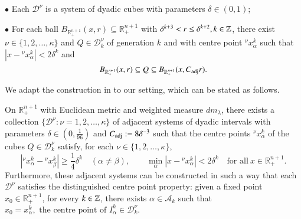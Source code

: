 \documentclass[12pt]{amsart}
\begin{document}
$\bullet$ Each $\mathcal{D}^\nu$ is a
system of dyadic cubes with parameters $\delta\in (0,1)$;

$\bullet$ For each ball
$B_{\mathbb{R}_+^{n+1}}(x,r)\subseteq \mathbb{R}_+^{n+1}$ with $\delta^{k+3}<r\leq\delta^{k+2},
k\in\mathbb{Z}$, there exist $\nu \in \{1, 2, \ldots, \kappa\}$ and
$Q\in\mathcal{D}_{k}^\nu$ of generation $k$ and with centre point
$^\nu x^k_{\alpha}$ such that $|x-{}^\nu x_{\alpha}^k| <
2\delta^{k}$ and
\begin{equation}\label{eq:ball;included}
    B_{\mathbb{R}_+^{n+1}}(x,r)\subseteq Q\subseteq B_{\mathbb{R}_+^{n+1}}(x,C_{\rm adj}r).
\end{equation}

We adapt the construction in \cite{HK} to our setting, which can be stated as follows.
\begin{lemma}\label{thm:existence2}
On $\mathbb{R}_+^{n+1}$ with Euclidean metric and weighted measure $dm_\lambda$, there exists a collection $\{\mathcal{D}^\nu\colon
    \nu = 1,2,\ldots ,\kappa\}$ of adjacent systems of dyadic intervals with
    parameters $\delta\in (0, \frac{1}{96}) $ and $C_{\rm adj} := 8\delta^{-3}$ such that the centre points
    $^\nu x^k_{\alpha}$ of the cubes $Q\in\mathcal{D}^\nu_{k}$ satisfy, for each
    $\nu \in\{1,2,\ldots,\kappa\}$,
    \begin{equation*}
        |^\nu x_{\alpha}^k- {}^\nu x_{\beta}^k|
        \geq \frac{1}{4}\delta^k\quad(\alpha\neq\beta),\qquad
        \min_{\alpha}|x-{}^\nu x^k_{\alpha}|
        < 2 \delta^k\quad \text{for all}~x\in \mathbb{R}_+^{n+1}.
    \end{equation*}
    Furthermore, these adjacent systems can be constructed in such a
    way that each $\mathcal{D}^\nu$ satisfies the distinguished
    centre point property: given a fixed point $x_{0}\in \mathbb{R}_{+}^{n+1}$, for every $k\in \mathbb{Z}$, there exists $\alpha\in\mathcal{A}_k$ such that
    $x_{0}
        = x^k_{\alpha},\text{ the centre point of }
        I^k_{\alpha}\in\mathcal{D}_{k}^\nu.$
\end{lemma}
%
\end{document}
